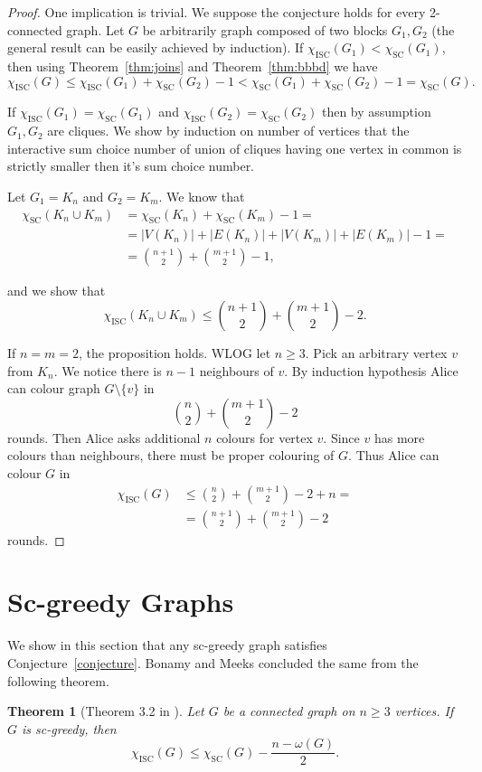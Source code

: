 \documentclass[11pt,a4paper]{article}
\theoremstyle{plain}
\newtheorem*{othm}{Theorem}
\theoremstyle{definition}
\theoremstyle{remark}
\newcommand{\scn}{\chi_\text{SC}}
\newcommand{\iscn}{\chi_\text{ISC}}
\begin{document}
\begin{proof}
One implication is trivial. We suppose the conjecture holds for every 2-connected graph. Let $G$ be arbitrarily graph composed of two blocks $G_1, G_2$ (the general result can be easily achieved by induction). If $\iscn(G_1)<\scn(G_1)$, then using Theorem~\ref{thm:joins} and Theorem~\ref{thm:bbbd} we have $$\iscn(G)\leq \iscn(G_1)+\scn(G_2)-1 < \scn(G_1)+\scn(G_2)-1 = \scn(G).$$

If $\iscn(G_1) = \scn(G_1)$ and $\iscn(G_2) = \scn(G_2)$ then by assumption $G_1, G_2$ are cliques. We show by induction on number of vertices that the interactive sum choice number of union of cliques having one vertex in common is strictly smaller then it's sum choice number.

Let $G_1 = K_n$ and $G_2 = K_m$. We know that \begin{align*}
\scn(K_n \cup K_m) &= \scn(K_n) + \scn(K_m) -1 = \\
&=|V(K_n)|+|E(K_n)|+|V(K_m)|+|E(K_m)|-1 = \\
&= {n+1 \choose 2} + {m+1 \choose 2} -1,
\end{align*}

and we show that $$\iscn(K_n \cup K_m) \leq {n+1 \choose 2} + {m+1 \choose 2} - 2.$$

If $n=m=2$, the proposition holds. WLOG let $n\geq 3$. Pick an arbitrary vertex $v$ from $K_n$. We notice there is $n-1$ neighbours of $v$. By induction hypothesis Alice can colour graph $G\setminus\{v\}$ in $${n \choose 2} + {m+1 \choose 2} - 2$$ rounds. Then Alice asks additional $n$ colours for vertex $v$. Since $v$ has more colours than neighbours, there must be proper colouring of $G$. Thus Alice can colour $G$ in \begin{align*}
\iscn(G) &\leq {n \choose 2} + {m+1 \choose 2} - 2 + n = \\
&= {n+1 \choose 2} + {m+1 \choose 2} - 2
\end{align*}
rounds.
\end{proof}


\section{Sc-greedy Graphs}

We show in this section that any sc-greedy graph satisfies Conjecture~\ref{conjecture}. Bonamy and Meeks concluded the same from the following theorem.
\begin{othm}[Theorem 3.2 in \cite{iscn}]
Let $G$ be a connected graph on $n \geq 3$ vertices. If $G$ is sc-greedy, then
$$\iscn(G) \leq \scn(G) - \frac{n-\omega(G)}{2}.$$
\end{othm} 
\end{document}
